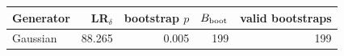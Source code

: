 \begin{tabular}{lrrrr}
\toprule
Generator & LR$_\delta$ & bootstrap $p$ & $B_{\rm boot}$ & valid bootstraps \\
\midrule
Gaussian & 88.265 & 0.005 & 199 & 199 \\
\bottomrule
\end{tabular}
